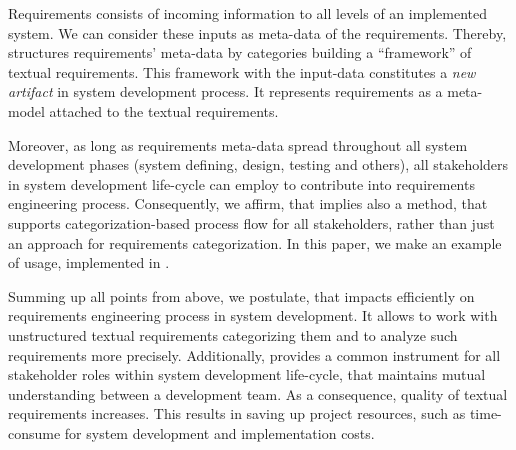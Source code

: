 Requirements consists of incoming information to all levels of an implemented system. 
We can consider these inputs as meta-data of the requirements. Thereby, \ca structures 
requirements' meta-data by categories building a ``framework'' of textual requirements. 
This framework with the input-data constitutes a \textit{new artifact} in system development process. 
It represents requirements as a meta-model attached to the textual requirements.

Moreover, as long as requirements meta-data spread throughout all system development phases 
(system defining, design, testing and others), all stakeholders in system development life-cycle 
can employ \care to contribute into requirements engineering process. Consequently, we affirm, that 
\ca implies also a method, that supports categorization-based process flow for all stakeholders, 
rather than just an approach for requirements categorization. In this paper, we make an example of \ca usage, 
implemented in \autof.

Summing up all points from above, we postulate, that \care impacts efficiently on requirements 
engineering process in system development. It allows to work with unstructured textual requirements 
categorizing them and to analyze such requirements more precisely. Additionally, \ca provides a common 
instrument for all stakeholder roles within system development life-cycle, that maintains mutual understanding
between a development team. As a consequence, quality of textual requirements increases. This results in saving up
project resources, such as time-consume for system development and implementation costs.





